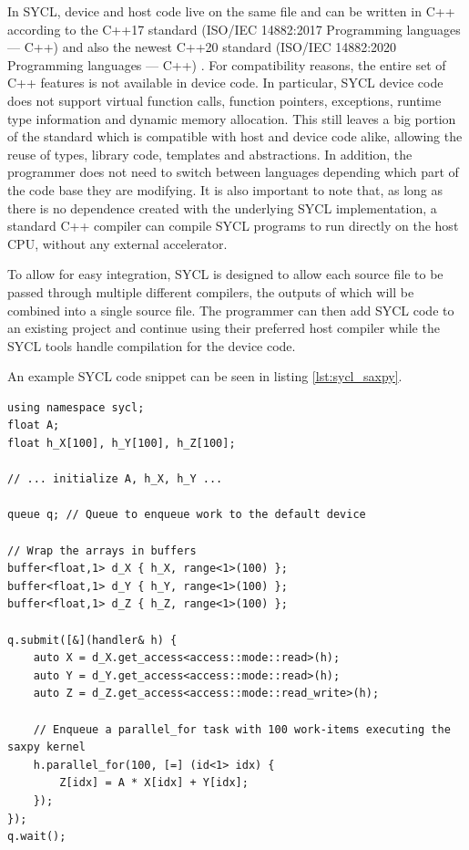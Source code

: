 In SYCL, device and host code live on the same file and can be written in C++ according to the C++17 standard (ISO/IEC 14882:2017 Programming languages — C++) \cite{cpp17} and also the newest C++20 standard (ISO/IEC 14882:2020 Programming languages — C++) \cite{cpp20}. For compatibility reasons, the entire set of C++ features is not available in device code. In particular, SYCL device code does not support virtual function calls, function pointers, exceptions, runtime type information and dynamic memory allocation.  This still leaves a big portion of the standard which is compatible with host and device code alike, allowing the reuse of types, library code, templates and abstractions. In addition, the programmer does not need to switch between languages depending which part of the code base they are modifying. It is also important to note that, as long as there is no dependence created with the underlying SYCL implementation, a standard C++ compiler can compile SYCL programs to run directly on the host CPU, without any external accelerator.

To allow for easy integration, SYCL is designed to allow each source file to be passed through multiple different compilers, the outputs of which will be combined into a single source file. The programmer can then add SYCL code to an existing project and continue using their preferred host compiler while the SYCL tools handle compilation for the device code.

An example SYCL code snippet can be seen in listing \ref{lst:sycl_saxpy}. 

\begin{lstlisting}[style=CStyle, caption=SYCL saxpy example, float, floatplacement=H, label={lst:sycl_saxpy}]
using namespace sycl;
float A;
float h_X[100], h_Y[100], h_Z[100];

// ... initialize A, h_X, h_Y ...

queue q; // Queue to enqueue work to the default device

// Wrap the arrays in buffers
buffer<float,1> d_X { h_X, range<1>(100) };
buffer<float,1> d_Y { h_Y, range<1>(100) };
buffer<float,1> d_Z { h_Z, range<1>(100) };

q.submit([&](handler& h) {
    auto X = d_X.get_access<access::mode::read>(h);
    auto Y = d_Y.get_access<access::mode::read>(h);
    auto Z = d_Z.get_access<access::mode::read_write>(h);

    // Enqueue a parallel_for task with 100 work-items executing the saxpy kernel
    h.parallel_for(100, [=] (id<1> idx) {
        Z[idx] = A * X[idx] + Y[idx];
    });
});
q.wait();
\end{lstlisting}

